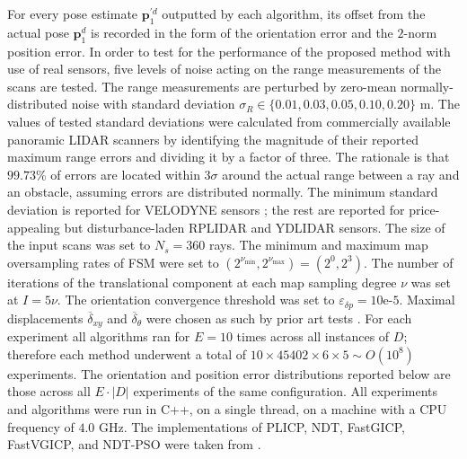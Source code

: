 For every pose estimate $\bm{p}_1^{\prime d}$ outputted by each algorithm, its
offset from the actual pose $\bm{p}_1^d$ is recorded in the form of the
orientation error and the $2$-norm position error.  In order to test for the
performance of the proposed method with use of real sensors, five levels of
noise acting on the range measurements of the scans are tested. The range
measurements are perturbed by zero-mean normally-distributed noise with
standard deviation $\sigma_R \in \{0.01, 0.03, 0.05, 0.10, 0.20\}$ m.  The
values of tested standard deviations were calculated from commercially
available panoramic LIDAR scanners by identifying the magnitude of their
reported maximum range errors and dividing it by a factor of three. The
rationale is that $99.73\%$ of errors are located within $3\sigma$ around the
actual range between a ray and an obstacle, assuming errors are distributed
normally. The minimum standard deviation is reported for VELODYNE sensors
\cite{velodyne_datasheet}; the rest are reported for price-appealing but
disturbance-laden RPLIDAR \cite{a2m8_datasheet} and YDLIDAR
\cite{ydlidar_datasheets} sensors. The size of the input scans was set to
$N_s=360$ rays. The minimum and maximum map oversampling rates of FSM were set
to $(2^{\nu_{\min}},2^{\nu_{\max}}) = (2^0,2^3)$.  The number of iterations of
the translational component at each map sampling degree $\nu$ was set at $I =
5\nu$. The orientation convergence threshold was set to $\varepsilon_{\delta p}
= 10$e-$5$. Maximal displacements $\overline{\delta}_{xy}$ and
$\overline{\delta}_\theta$ were chosen as such by prior art tests
\cite{Censi2008b}.  For each experiment all algorithms ran for $E = 10$ times
across all instances of $D$; therefore each method underwent a total of $10
\times 45402 \times 6 \times 5 \sim O(10^8)$ experiments. The orientation and
position error distributions reported below are those across all $E \cdot |D|$
experiments of the same configuration.  All experiments and algorithms were run
in C++, on a single thread, on a machine with a CPU frequency of $4.0$ GHz. The
implementations of PLICP, NDT, FastGICP, FastVGICP, and NDT-PSO were taken from
\cite{implementations}.
